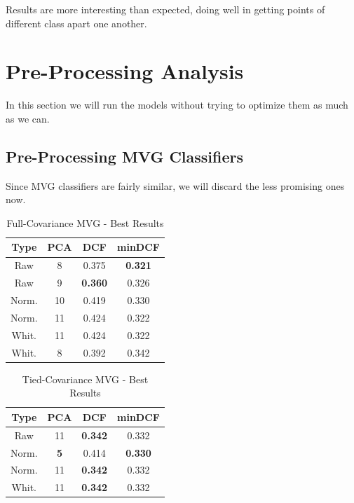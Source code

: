 \documentclass[hidelinks, 12pt, twocolumn]{article}
\begin{document}
Results are more interesting than expected,
doing well in getting points of different class
apart one another.

\section{Pre-Processing Analysis}

In this section we will run the models without trying to optimize them as much as we can.

\subsection{Pre-Processing MVG Classifiers}

Since MVG classifiers are fairly similar, 
we will discard the less promising ones now.

\begin{table}[H] 
    \centering
    \begin{tabular}{||c|c|c|c||}
        \hline
        Type & PCA & DCF & minDCF \\
        \hline
        \hline
        Raw   & 8  & 0.375 & {\bf 0.321} \\
        Raw   & 9  & {\bf 0.360} & 0.326 \\
        Norm. & 10 & 0.419 & 0.330 \\
        Norm. & 11 & 0.424 & 0.322 \\
        Whit. & 11 & 0.424 & 0.322 \\
        Whit. & 8  & 0.392 & 0.342 \\
        \hline
    \end{tabular}
    \caption{Full-Covariance MVG - Best Results}
    \label{fullcovtab}
\end{table}

    
\begin{table}[H] 
    \centering
    \begin{tabular}{||c|c|c|c||}
        \hline
        Type & PCA & DCF & minDCF \\
        \hline
        \hline
        Raw   & 11 & {\bf 0.342} & 0.332 \\
        Norm. & {\bf 5}  & 0.414 & {\bf 0.330} \\
        Norm. & 11 & {\bf 0.342} & 0.332 \\
        Whit. & 11 & {\bf 0.342} & 0.332 \\
        \hline
    \end{tabular}
    \caption{Tied-Covariance MVG - Best Results}
    \label{tiedcovtab}
\end{table}
\end{document}
